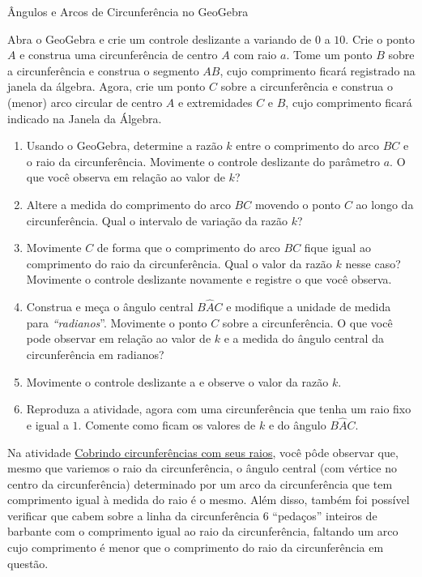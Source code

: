 \begin{task}{Ângulos e Arcos de Circunferência no GeoGebra}
\label{trig-ativ8}

Abra o GeoGebra e crie um controle deslizante a variando de $0$ a $10$. Crie o ponto $A$ e construa uma circunferência de centro $A$ com raio $a$. Tome um ponto $B$ sobre a circunferência e construa o segmento $AB$, cujo comprimento ficará registrado na janela da álgebra. Agora, crie um ponto $C$ sobre a circunferência e construa o (menor) arco circular de centro $A$ e extremidades $C$ e $B$, cujo comprimento ficará indicado na Janela da Álgebra.

\begin{enumerate}
\item Usando o GeoGebra, determine a razão $k$ entre o comprimento do arco $BC$ e o raio da circunferência. Movimente o controle deslizante do parâmetro $a$. O que você observa em relação ao valor de $k$?
\item Altere a medida do comprimento do arco $BC$ movendo o ponto $C$ ao longo da circunferência. Qual o intervalo de variação da razão $k$?
\item Movimente $C$ de forma que o comprimento do arco $BC$ fique igual ao comprimento do raio da circunferência. Qual o valor da razão $k$ nesse caso? Movimente o controle deslizante novamente e registre o que você observa.
\item Construa e meça o ângulo central ${B\hat{A}C}$ e modifique a unidade de medida para \textit{“radianos}”. Movimente o ponto $C$ sobre a circunferência. O que você pode observar em relação ao valor de $k$ e a medida do ângulo central da circunferência em radianos?
\item Movimente o controle deslizante a e observe o valor da razão $k$.
\item Reproduza a atividade, agora com uma circunferência que tenha um raio fixo e igual a $1$. Comente como ficam os valores de $k$ e do ângulo ${B\hat{A}C}$.
\end{enumerate}

\end{task}

\label{trig-arg2}

Na atividade \hyperref[trig-ativ7]{Cobrindo circunferências com seus raios}, você pôde observar que, mesmo que variemos o raio da circunferência, o ângulo central (com vértice no centro da circunferência) determinado por um arco da circunferência que tem comprimento igual à medida do raio é o mesmo. Além disso, também foi possível verificar que cabem sobre a linha da circunferência $6$ “pedaços”{} inteiros de barbante com o comprimento igual ao raio da circunferência, faltando um arco cujo comprimento é menor que o comprimento do raio da circunferência em questão.

